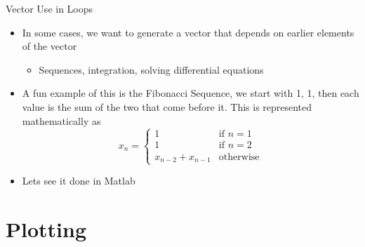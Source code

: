 {}\documentclass[letterpaper,
compress,
xcolor=x11names,
]{beamer}
\begin{document}

\begin{frame}{Vector Use in Loops}
	\footnotesize
	\begin{itemize}
		\item In some cases, we want to generate a vector that depends on earlier elements of the vector
		\begin{itemize}
			\item Sequences, integration, solving differential equations
		\end{itemize}
		\item A fun example of this is the Fibonacci Sequence, we start with 1, 1, then each value is the sum of the two that come before it. This is represented mathematically as 
		\begin{equation*}
			x_n =  \begin{cases}
				1 & \text{if } n=1 \\
				1 & \text{if } n=2 \\
				x_{n-2} + x_{n-1} & \text{otherwise}
			\end{cases}
		\end{equation*}
		\item<2-> Lets see it done in Matlab
		\begin{center}
		\end{center}
	\end{itemize}
\end{frame}

\section{Plotting}
\end{document}
